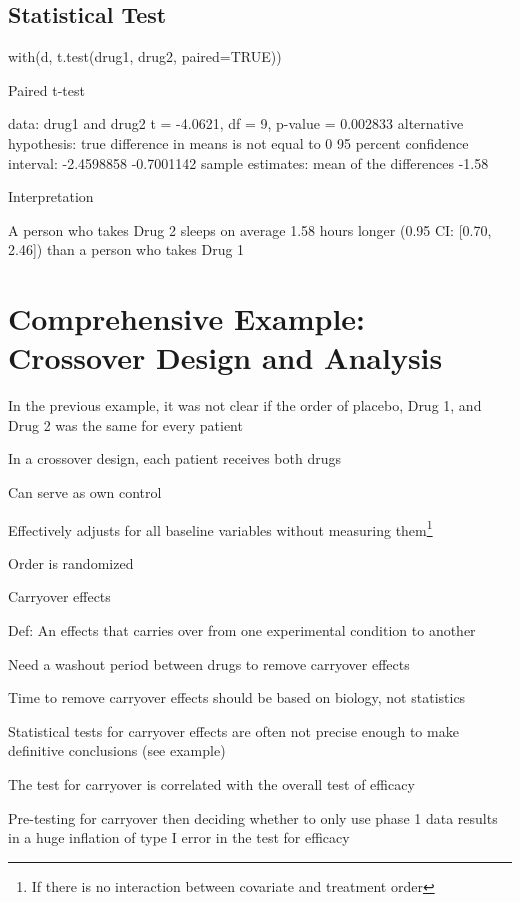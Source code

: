 \subsection{Statistical Test}
\begin{Schunk}
\begin{Sinput}
with(d, t.test(drug1, drug2, paired=TRUE))
\end{Sinput}
\begin{Soutput}

	Paired t-test

data:  drug1 and drug2
t = -4.0621, df = 9, p-value = 0.002833
alternative hypothesis: true difference in means is not equal to 0
95 percent confidence interval:
 -2.4598858 -0.7001142
sample estimates:
mean of the differences 
                  -1.58 
\end{Soutput}
\end{Schunk}
\bi
\item Interpretation
 \bi
 \item A person who takes Drug 2 sleeps on average 1.58 hours longer (0.95 CI: [0.70, 2.46]) than a person who takes Drug 1
 \ei
\ei

\clearpage
\section{Comprehensive Example: Crossover Design and Analysis}
\bi
 \item In the previous example, it was not clear if the order of placebo, Drug 1, and Drug 2 was the same for every patient
 \item In a crossover design, each patient receives both drugs
   \bi
     \item Can serve as own control
     \item Effectively adjusts for all baseline variables without measuring them\footnote{If there is no interaction between covariate and treatment order}
     \item Order is randomized
   \ei
 \item Carryover effects
   \bi
      \item Def: An effects that carries over from one experimental condition to another
      \item Need a washout period between drugs to remove carryover effects
      \item Time to remove carryover effects should be based on biology, not statistics
      \item Statistical tests for carryover effects are often not
        precise enough to make definitive conclusions (see example) 
      \item The test for carryover is correlated with the overall
        test of efficacy
      \item Pre-testing for carryover then deciding whether to only
        use phase 1 data results in a huge inflation of type I error
        in the test for efficacy
   \ei
\ei

